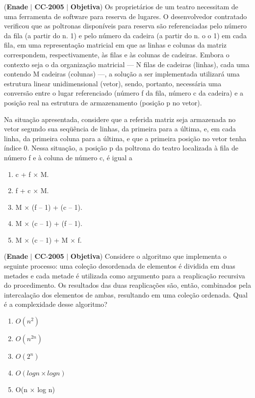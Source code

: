 \documentclass{exam}
\begin{document}
\begin{questions}
\question (\textbf{Enade} $|$ \textbf{CC}-\textbf{2005} $|$ \textbf{Objetiva})
Os proprietários de um teatro necessitam de uma
ferramenta de software para reserva de lugares.
O desenvolvedor contratado verificou que as poltronas
disponíveis para reserva são referenciadas pelo número da fila
(a partir do n. 1) e pelo número da cadeira (a partir do n.
o o
1) em cada fila, em uma representação matricial em que as
linhas e colunas da matriz correspondem, respectivamente, às
filas e às colunas de cadeiras. Embora o contexto seja o da
organização matricial — N filas de cadeiras (linhas), cada uma
contendo M cadeiras (colunas) —, a solução a ser
implementada utilizará uma estrutura linear unidimensional
(vetor), sendo, portanto, necessária uma conversão entre o
lugar referenciado (número f da fila, número c da cadeira) e
a posição real na estrutura de armazenamento (posição p no
vetor).

Na situação apresentada, considere que a referida matriz seja
armazenada no vetor segundo sua seqüência de linhas, da primeira
para a última, e, em cada linha, da primeira coluna para a última,
e que a primeira posição no vetor tenha índice 0. Nessa situação,
a posição p da poltrona do teatro localizada à fila de número f e
à coluna de número c, é igual a
	\begin{enumerate}[label=\alph*)]
		\item  c + f × M.
		\item  f + c × M.
		\item  M × (f – 1) + (c – 1).
		\item  M × (c – 1) + (f – 1).
		\item  M × (c – 1) + M × f.
	\end{enumerate}

\question (\textbf{Enade} $|$ \textbf{CC}-\textbf{2005} $|$ \textbf{Objetiva})
Considere o algoritmo que implementa o seguinte processo: uma
coleção desordenada de elementos é dividida em duas metades e
cada metade é utilizada como argumento para a reaplicação
recursiva do procedimento. Os resultados das duas reaplicações
são, então, combinados pela intercalação dos elementos de ambas,
resultando em uma coleção ordenada. Qual é a complexidade desse
algoritmo?
	\begin{enumerate}[label=\alph*)]
		\item  $O(n^2)$
		\item  $O(n^{2n})$
		\item  $O(2^n)$
		\item  $O(log n \times log n)$
		\item  O(n × log n)
	\end{enumerate}


\end{questions}
\end{document}
